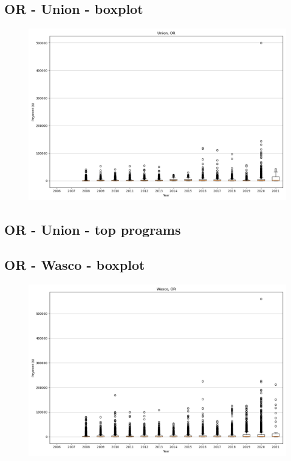 \subsection*{OR - Union - boxplot}
\begin{figure}[h]
\centering
\includegraphics[width=7in]{../output/boxplots/counties/Union-OR_boxplot.png}
\end{figure}


\subsection*{OR - Union - top programs}

\newpage
\subsection*{OR - Wasco - boxplot}
\begin{figure}[h]
\centering
\includegraphics[width=7in]{../output/boxplots/counties/Wasco-OR_boxplot.png}
\end{figure}



